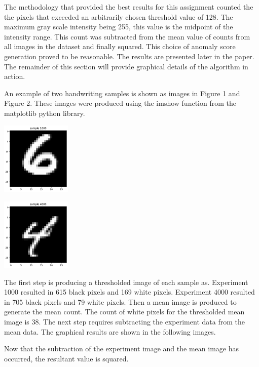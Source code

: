 The methodology that provided the best results for this assignment counted the the pixels that exceeded an arbitrarily chosen threshold value of 128. The maximum gray scale intensity being 255, this value is the midpoint of the intensity range. This count was subtracted from the mean value of counts from all images in the dataset and finally squared. This choice of anomaly score generation proved to be reasonable. The results are presented later in the paper. The remainder of this section will provide graphical details of the algorithm in action.

An example of two handwriting samples is shown as images in Figure 1 and Figure 2. These images were produced using the imshow function from the matplotlib python library.


\begin{center}
\includegraphics[width=0.25\textwidth]{./images/image1.png}

\label{fig:sample1}
\end{center}



\begin{center}
\includegraphics[width=0.25\textwidth]{./images/image2.png}
\label{fig:sample2}


\end{center}



The first step is producing a thresholded image of each sample as. Experiment 1000 resulted in 615 black pixels and 169 white pixels. Experiment 4000 resulted in 705 black pixels and 79 white pixels.
Then a mean image is produced to generate the mean count.
The count of white pixels for the thresholded mean image is 38.
The next step requires subtracting the experiment data from the mean data. The graphical results are shown in the following images.

Now that the subtraction of the experiment image and the mean image has occurred, the resultant value is squared.
